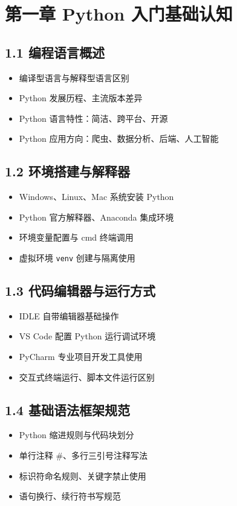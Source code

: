 
\section{第一章 Python 入门基础认知}
\subsection{1.1 编程语言概述}
\begin{itemize}
\item 编译型语言与解释型语言区别
\item Python 发展历程、主流版本差异
\item Python 语言特性：简洁、跨平台、开源
\item Python 应用方向：爬虫、数据分析、后端、人工智能
\end{itemize}

\subsection{1.2 环境搭建与解释器}
\begin{itemize}
\item Windows、Linux、Mac 系统安装 Python
\item Python 官方解释器、Anaconda 集成环境
\item 环境变量配置与 cmd 终端调用
\item 虚拟环境 \texttt{venv} 创建与隔离使用
\end{itemize}

\subsection{1.3 代码编辑器与运行方式}
\begin{itemize}
\item IDLE 自带编辑器基础操作
\item VS Code 配置 Python 运行调试环境
\item PyCharm 专业项目开发工具使用
\item 交互式终端运行、脚本文件运行区别
\end{itemize}

\subsection{1.4 基础语法框架规范}
\begin{itemize}
\item Python 缩进规则与代码块划分
\item 单行注释 \#、多行三引号注释写法
\item 标识符命名规则、关键字禁止使用
\item 语句换行、续行符书写规范
\end{itemize}


